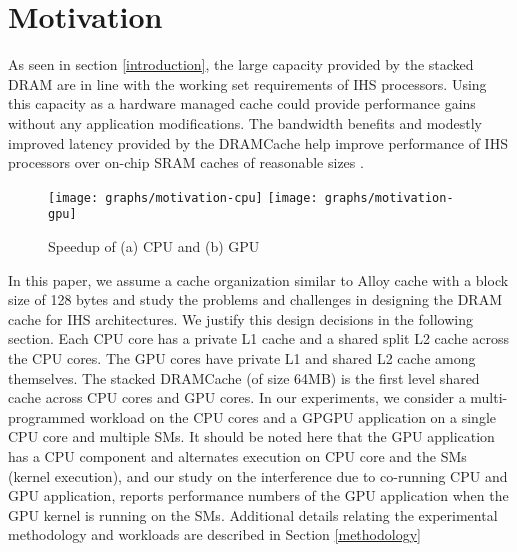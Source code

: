 \section{Motivation} \label{motivation}
As seen in section \ref{introduction}, the large capacity provided by the stacked DRAM are in line with the working set requirements of IHS processors. Using this capacity as a hardware managed cache could provide performance gains without any application modifications. The bandwidth benefits and modestly improved latency provided by the DRAMCache help improve performance of IHS processors over on-chip SRAM caches of reasonable sizes \cite{amd-exascale1}. 
\begin{figure}[htbp]
   \texttt{[image: graphs/motivation-cpu]}
   \texttt{[image: graphs/motivation-gpu]}
   \caption{Speedup of (a) CPU and (b) GPU}
   \label{fig:motivation}
\end{figure}
\par In this paper, we assume a cache organization similar to Alloy cache \cite{alloy} with a block size of 128 bytes and study the problems and challenges in designing the DRAM cache for IHS architectures. We justify this design decisions in the following section. 
Each CPU core has a private L1 cache and a shared split L2 cache across the CPU cores. The GPU cores have private L1 and shared L2 cache among themselves.  
The stacked DRAMCache (of size 64MB) is the first level shared cache across CPU cores and GPU cores. In our experiments, we consider a multi-programmed workload on the CPU cores and a GPGPU application on a single CPU core and multiple SMs. It should be noted here that the GPU application has a CPU component and alternates execution on CPU core and the SMs (kernel execution), and our study on the interference due to co-running CPU and GPU application, reports performance numbers of the GPU application when the GPU kernel is running on the SMs.  
Additional details relating the experimental methodology and workloads are described in Section \ref{methodology}


